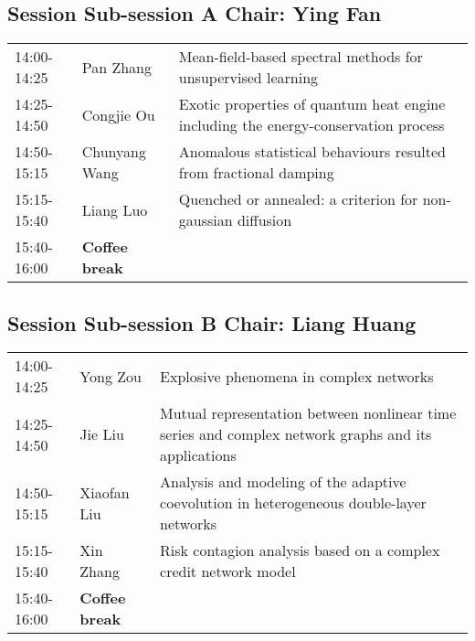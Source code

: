 \documentclass[oneside,A4paper,12pt]{article}
\begin{document}
\subsection*{Session \uppercase\expandafter{} \hspace{10mm} Sub-session A \hspace{10mm} Chair: Ying Fan}
\label{sec:orgf168369}

\begin{center}
\begin{tabular}{p{2.5cm}p{4cm}p{8.5cm}}
\toprule
14:00-14:25 & Pan Zhang & Mean-field-based spectral methods for unsupervised learning\\
14:25-14:50 & Congjie Ou & Exotic properties of quantum heat engine including the energy-conservation process\\
14:50-15:15 & Chunyang Wang & Anomalous statistical behaviours resulted from fractional damping\\
15:15-15:40 & Liang Luo & Quenched or annealed: a criterion for non-gaussian diffusion\\
\cellcolor{blue!25}15:40-16:00 & \cellcolor{blue!25}\textbf{Coffee break} & \cellcolor{blue!25}\\
\bottomrule
\end{tabular}
\end{center}


\subsection*{Session \uppercase\expandafter{} \hspace{10mm} Sub-session B \hspace{10mm} Chair: Liang Huang}
\label{sec:org858d690}

\begin{center}
\begin{tabular}{p{2.5cm}p{4cm}p{8.5cm}}
\toprule
14:00-14:25 & Yong Zou & Explosive phenomena in complex networks\\
14:25-14:50 & Jie Liu & Mutual representation between nonlinear time series and complex network graphs and its applications\\
14:50-15:15 & Xiaofan Liu & Analysis and modeling of the adaptive coevolution in heterogeneous double-layer networks\\
15:15-15:40 & Xin Zhang & Risk contagion analysis based on a complex credit network model\\
\cellcolor{blue!25}15:40-16:00 & \cellcolor{blue!25}\textbf{Coffee break} & \cellcolor{blue!25}\\
\bottomrule
\end{tabular}
\end{center}
\end{document}
